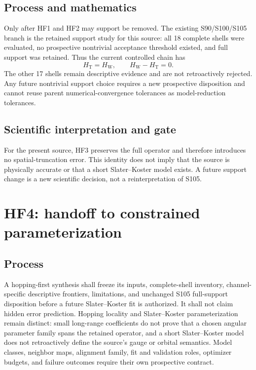 \documentclass[11pt]{report}
\begin{document}
\section{Process and mathematics}

Only after HF1 and HF2 may support be removed.  The existing S90/S100/S105 branch is the
retained support study for this source: all 18 complete shells were evaluated, no
prospective nontrivial acceptance threshold existed, and full support was retained.
Thus the current controlled chain has
\begin{equation}
 H_{\mathrm{T}}=H_{\mathrm{W}},\qquad
 H_{\mathrm{W}}-H_{\mathrm{T}}=0.
\end{equation}
The other 17 shells remain descriptive evidence and are not retroactively rejected.
Any future nontrivial support choice requires a new prospective disposition and cannot
reuse parent numerical-convergence tolerances as model-reduction tolerances.

\section{Scientific interpretation and gate}

For the present source, HF3 preserves the full operator and therefore introduces no
spatial-truncation error.  This identity does not imply that the source is physically
accurate or that a short Slater--Koster model exists.  A future support change is a new
scientific decision, not a reinterpretation of S105.

\chapter{HF4: handoff to constrained parameterization}

\section{Process}

A hopping-first synthesis shall freeze its inputs, complete-shell inventory,
channel-specific descriptive frontiers, limitations, and unchanged S105 full-support
disposition before a future Slater--Koster fit is authorized.  It shall not claim hidden
error prediction.  Hopping locality and Slater--Koster parameterization remain distinct:
small long-range coefficients do not prove that a chosen angular parameter family spans
the retained operator, and a short Slater--Koster model does not retroactively define
the source's gauge or orbital semantics.  Model classes, neighbor maps, alignment
family, fit and validation roles, optimizer budgets, and failure outcomes require their
own prospective contract.
\end{document}
